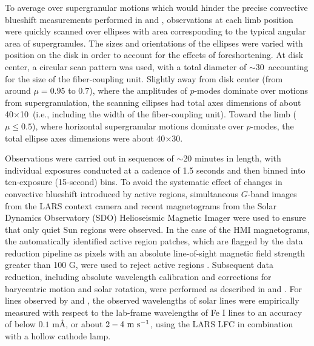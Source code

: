 \documentclass[twocolumn]{aastex63}
\newcommand{\ms}{{\rm m\ s}^{-1}}
\newcommand{\revise}[1]{#1}
\begin{document}
To average over supergranular motions which would hinder the precise convective blueshift measurements performed in  and , observations at each limb position were quickly scanned over ellipses with area corresponding to the typical angular area of supergranules. \revise{The sizes and orientations of the ellipses were varied with position on the disk in order to account for the effects of foreshortening. At disk center, a circular scan pattern was used, with a total diameter of $\sim$30\arcsec\ accounting for the size of the fiber-coupling unit. Slightly away from disk center (from around $\mu = 0.95$ to $0.7$), where the amplitudes of $p$-modes dominate over motions from supergranulation, the scanning ellipses had total axes dimensions of about 40\arcsec$\times$10\arcsec\ (i.e., including the width of the fiber-coupling unit). Toward the limb ($\mu \leq 0.5$), where horizontal supergranular motions dominate over $p$-modes, the total ellipse axes dimensions were about 40\arcsec$\times$30\arcsec.} \par 

Observations were carried out in \revise{sequences of} $\sim$20 minutes in length, with individual exposures conducted at a cadence of 1.5 seconds and then binned into ten-exposure (15-second) bins. To avoid \revise{the systematic effect of changes in convective blueshift} introduced by active regions, simultaneous $G$-band images from the LARS context camera and recent magnetograms from the Solar Dynamics Observatory (SDO) Helioseismic Magnetic Imager \citep[HMI,][]{Pesnell2012, Scherrer2012} were used to ensure that only quiet Sun regions were observed. \revise{In the case of the HMI magnetograms, the automatically identified active region patches, which are flagged by the data reduction pipeline as pixels with an absolute line-of-sight magnetic field strength greater than 100 G, were used to reject active regions \citep{Hoeksema2014}.} Subsequent data reduction, including absolute wavelength calibration and corrections for barycentric motion and solar rotation, were performed as described in \citet{Lohner-Bottcher2017} and . For lines observed by  and , the \revise{observed} wavelengths of solar lines were empirically measured \revise{with respect to the lab-frame wavelengths of Fe \textsc{I} lines to an accuracy of below $0.1$ m\AA, or about $2-4\ \ms$,} using the \revise{LARS LFC in combination with a} hollow cathode lamp. \par
\end{document}
